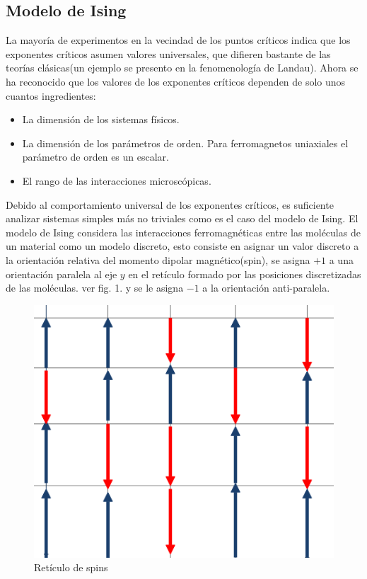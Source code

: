 \documentclass[a4paper]{article}
\begin{document}
\subsection{Modelo de Ising}
La mayoría de experimentos en la vecindad de los puntos críticos indica que los exponentes críticos asumen valores universales, que difieren bastante de las teorías clásicas(un ejemplo se presento en la fenomenología de Landau). Ahora se ha reconocido que los valores de los exponentes críticos dependen de solo unos cuantos ingredientes:
\begin{itemize}
\item La dimensión de los sistemas físicos.
\item La dimensión de los parámetros de orden. Para ferromagnetos uniaxiales el parámetro de orden es un escalar.
\item El rango de las interacciones microscópicas.
\end{itemize}
Debido al comportamiento universal de los exponentes críticos, es suficiente analizar sistemas simples más no triviales como es el caso del modelo de Ising. El modelo de Ising considera las interacciones ferromagnéticas entre las moléculas de un material como un modelo discreto, esto consiste en asignar un valor discreto a la orientación relativa del momento dipolar magnético(spin), se asigna $+1$ a una orientación paralela al eje $y$ en el retículo formado por las posiciones discretizadas de las moléculas. ver fig. 1. y se le asigna $-1$ a la orientación anti-paralela. 

\begin{figure}[H]
\begin{center}
\includegraphics[scale=0.4]{LatticeIsing.png} 
\end{center} 
\caption{Retículo de spins}
\end{figure}
\end{document}
